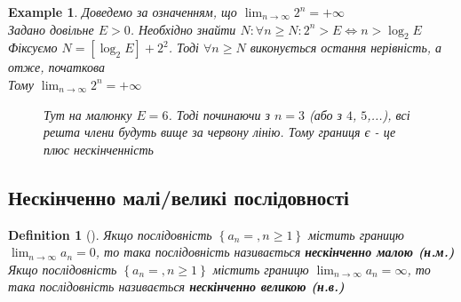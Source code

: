 \documentclass[a4paper, 14pt]{extarticle}
\def\huge{\displaystyle}
\newcommand{\sequence}[2][{}]{%
\ifthenelse{\equal{#1}{}}{$\{{#2}, n \geq 1 \}$}
{$\huge \left\{ {#2} = {#1}, n \geq 1 \right\}$}%
}
\theoremstyle{theoremdd}
\theoremstyle{theoremdd}
\newtheorem{definition}[theorem]{Definition}
\theoremstyle{theoremdd}
\theoremstyle{theoremdd}
\newtheorem{example}[theorem]{Example}
\theoremstyle{theoremdd}
\theoremstyle{theoremdd}
\theoremstyle{theoremdd}
\theoremstyle{theoremdd}
\begin{document}
\begin{example}
	Доведемо за означенням, що $\displaystyle\lim_{n \to \infty} 2^n = +\infty$\\
	Задано довільне $E>0$. Необхідно знайти $N: \forall n \geq N: 2^n>E \iff n>\log_2{E}$\\
	Фіксуємо $N=\left[\log_2{E} \right] + 2^2$. Тоді $\forall n \geq N$ виконується остання нерівність, а отже, початкова\\
	Тому $\displaystyle\lim_{n \to \infty} 2^n = +\infty$\\
	\begin{figure}[H]
\centering
\resizebox{0.6\textwidth}{!} {
}
\caption*{Тут на малюнку $E = 6$. Тоді починаючи з $n=3$ (або з $4$, $5$,...), всі решта члени будуть вище за червону лінію. Тому границя є - це плюс нескінченність}
\end{figure}
\end{example}
	
	\subsection{Нескінченно малі/великі послідовності}
	\begin{definition}[\hspace{0.1cm}]
	Якщо послідовність \sequence{a_n} містить границю $\displaystyle\lim_{n \to \infty} a_n = 0$, то така послідовність називається \textbf{нескінченно малою (н.м.)}\\
	Якщо послідовність \sequence{a_n} містить границю $\displaystyle\lim_{n \to \infty} a_n = \infty$, то така послідовність називається \textbf{нескінченно великою (н.в.)}
	\end{definition}
	
\end{document}
